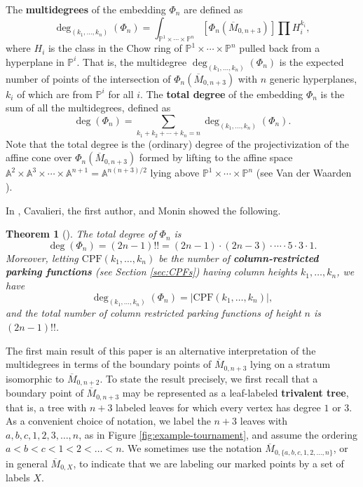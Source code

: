 \documentclass[11pt]{amsart}
\newcommand{\Mbar}{\overline{M}}
\newcommand{\bA}{\mathbb{A}}
\newcommand{\PP}{\mathbb{P}}
\newcommand{\CPF}{\mathrm{CPF}}
\newcommand{\defn}{\textbf}
\newcommand{\emb}{\Phi}
\newtheorem{thm}{Theorem}
\numberwithin{thm}{section}
\numberwithin{equation}{section}
\numberwithin{figure}{section}
\theoremstyle{definition}
\begin{document}
The \defn{multidegrees} of the embedding $\emb_n$ are defined as 
\begin{equation}\label{eq:multidegree}
    \deg_{(k_1,\ldots,k_n)}(\emb_n)=\int_{\PP^1\times \cdots \times \PP^n}[\emb_n(\Mbar_{0,n+3})]\prod H_i^{k_i},
\end{equation} where $H_i$ is the class in the Chow ring of $\PP^1\times \cdots \times \PP^n$ pulled back from a hyperplane in $\PP^i$.  That is, the multidegree $\deg_{(k_1,\ldots,k_n)}(\emb_n)$  is the expected number of points of the intersection of $\emb_n(\Mbar_{0,n+3})$ with $n$ generic hyperplanes, $k_i$ of which are from $\PP^i$ for all $i$.  The \defn{total degree} of the embedding $\emb_n$ is the sum of all the multidegrees, defined as  $$\deg(\emb_n)=\sum_{k_1+k_2+\cdots+k_n=n} \deg_{(k_1,\ldots,k_n)}(\emb_n).$$ Note that the total degree is the (ordinary) degree of the projectivization of the affine cone over $\emb_n(\Mbar_{0,n+3})$ formed by lifting to the affine space $\bA^2\times \bA^3 \times \cdots \times \bA^{n+1}=\bA^{n(n+3)/2}$ lying above $\PP^1\times \cdots \times \PP^n$ (see Van der Waarden \cite{van}).

In \cite{CGM}, Cavalieri, the first author, and Monin showed the following.
\begin{thm}[\cite{CGM}]\label{thm:intro-odd-double-factorial}
 The total degree of $\emb_n$ is \begin{equation}\label{eq:total-degree}\deg(\emb_n)=(2n-1)!!=(2n-1)\cdot (2n-3)\cdot \cdots \cdot 5\cdot 3 \cdot 1.\end{equation}  Moreover, letting $\CPF(k_1,\ldots,k_n)$ be the number of \textbf{column-restricted parking functions} (see Section \ref{sec:CPFs}) having column heights $k_1,\ldots,k_n$, we have $$\deg_{(k_1,\ldots,k_n)}(\emb_n)=|\CPF(k_1,\ldots,k_n)|,$$ and the total number of column restricted parking functions of height $n$ is $(2n-1)!!$.
\end{thm} 
The first main result of this paper is an alternative interpretation of the multidegrees in terms of the boundary points of $\Mbar_{0,n+3}$ lying on a stratum isomorphic to $\Mbar_{0,n+2}$. To state the result precisely, we first recall that a boundary point of $\Mbar_{0,n+3}$ may be represented as a leaf-labeled \defn{trivalent tree}, that is, a tree with $n+3$ labeled leaves for which every vertex has degree $1$ or $3$.  As a convenient choice of notation, we label the $n+3$ leaves with $a,b,c,1,2,3,\ldots,n$, as in Figure \ref{fig:example-tournament}, and assume the ordering $a<b<c<1<2<\ldots<n$.  We sometimes use the notation $\Mbar_{0,\{a,b,c,1,2,\ldots,n\}}$, or in general $\Mbar_{0,X}$, to indicate that we are labeling our marked points by a set of labels $X$.
\end{document}
